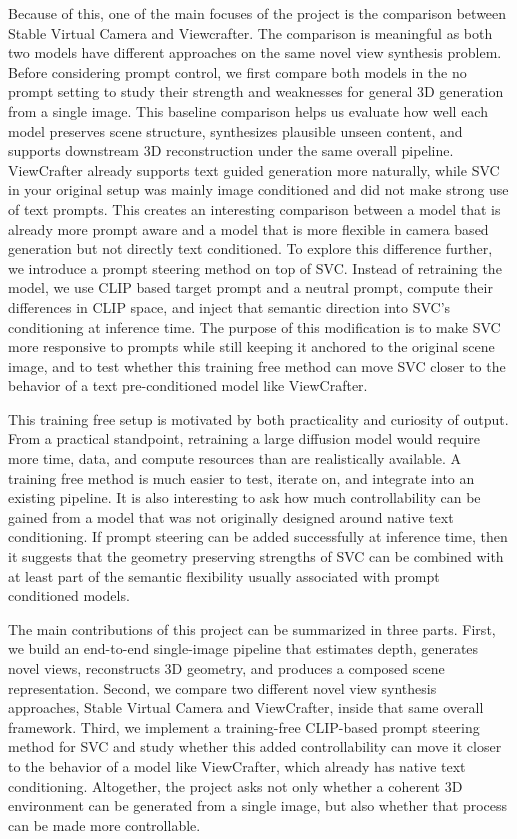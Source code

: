 \documentclass{article}
\begin{document}
Because of this, one of the main focuses of the project is the comparison between Stable Virtual Camera and Viewcrafter. The comparison is meaningful as both two models have different approaches on the same novel view synthesis problem. Before considering prompt control, we first compare both models in the no prompt setting to study their strength and weaknesses for general 3D generation from a single image. This baseline comparison helps us evaluate how well each model preserves scene structure, synthesizes plausible unseen content, and supports downstream 3D reconstruction under the same overall pipeline. ViewCrafter already supports text guided generation more naturally, while SVC in your original setup was mainly image conditioned and did not make strong use of text prompts. This creates an interesting comparison between a model that is already more prompt aware and a model that is more flexible in camera based generation but not directly text conditioned. To explore this difference further, we introduce a prompt steering method on top of SVC. Instead of retraining the model, we use CLIP based target prompt and a neutral prompt, compute their differences in CLIP space, and inject that semantic direction into SVC's conditioning at inference time. The purpose of this modification is to make SVC more responsive to prompts while still keeping it anchored to the original scene image, and to test whether this training free method can move SVC closer to the behavior of a text pre-conditioned model like ViewCrafter.

This training free setup is motivated by both practicality and curiosity of output. From a practical standpoint, retraining a large diffusion model would require more time, data, and compute resources than are realistically available. A training free method is much easier to test, iterate on, and integrate into an existing pipeline. It is also interesting to ask how much controllability can be gained from a model that was not originally designed around native text conditioning. If prompt steering can be added successfully at inference time, then it suggests that the geometry preserving strengths of SVC can be combined with at least part of the semantic flexibility usually associated with prompt conditioned models.

The main contributions of this project can be summarized in three parts. First, we build an end-to-end single-image pipeline that estimates depth, generates novel views, reconstructs 3D geometry, and produces a composed scene representation. Second, we compare two different novel view synthesis approaches, Stable Virtual Camera and ViewCrafter, inside that same overall framework. Third, we implement a training-free CLIP-based prompt steering method for SVC and study whether this added controllability can move it closer to the behavior of a model like ViewCrafter, which already has native text conditioning. Altogether, the project asks not only whether a coherent 3D environment can be generated from a single image, but also whether that process can be made more controllable.
\end{document}
